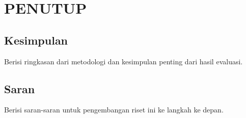 
\chapter{PENUTUP}
\label{cha:5-KesimpulanSaran}

\section{Kesimpulan}
\label{sec:5-Kesimpulan}
Berisi ringkasan dari metodologi dan kesimpulan penting dari hasil evaluasi.

\section{Saran}
\label{sec:5-Saran}
Berisi saran-saran untuk pengembangan riset ini ke langkah ke depan.
